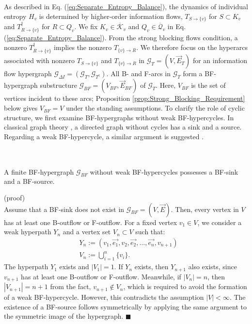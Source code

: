 \documentclass{comnet}%
\begin{document}
As described in Eq. (\ref{eq:Separate_Entropy_Balance}), the dynamics of individual entropy $H_{v}$ is determined by higher-order information flows, $T_{S \to \{v\}}$ for $S \subset K_v$ and $T^{\dagger}_{R \to \{v\}}$ for $R \subset Q_v$. We fix $K_v\in\overline{\mathcal K}_v$ and $Q_v\in\overline{\mathcal Q}_v$ in Eq. (\ref{eq:Separate_Entropy_Balance}). From the strong blocking flows condition, a nonzero $T^{\dagger}_{R \to \{v\}}$ implies the nonzero $T_{\{v\} \to R}$. We therefore focus on the hyperarcs associated with nonzero $T_{S \to \{v\}}$ and $T_{\{v\} \to R}$ in $\mathcal{G}_{T}=(V, \overrightarrow{E}_{T})$ for an information flow hypergraph $\mathcal{G}_{\Delta I} = (\mathcal{G}_{T}, \mathcal{G}_{T^{\dagger}})$. All B- and F-arcs in $\mathcal G_T$ form a BF-hypergraph substructure $\mathcal{G}_{BF} = (V_{BF}, \overrightarrow{E}_{BF})$ of $\mathcal{G}_{T}$. Here, $V_{BF}$ is the set of vertices incident to these arcs; Proposition \ref{prop:Strong_Blocking_Requirement} below gives $V_{BF}=V$ under the standing assumptions. To clarify the role of cyclic structure, we first examine BF-hypergraphs without weak BF-hypercycles. In classical graph theory \cite{Diestel2017,Kleinberg2005}, a directed graph without cycles has a sink and a source. Regarding a weak BF-hypercycle, a similar argument is suggested \cite{Bretto2013}.\\ \quad \\ \quad \\

\begin{proposition}
	A finite BF-hypergraph $\mathcal{G}_{BF}$ without weak BF-hypercycles possesses a BF-sink and a BF-source.\\
	\label{prop:Exist_BF_sink_source}\end{proposition}
(proof)\\
Assume that a BF-sink does not exist in $\mathcal{G}_{BF} = (V, \overrightarrow{E})$. Then, every vertex in $V$ has at least one B-outflow or F-outflow. For a fixed vertex $v_{1} \in V$, we consider a weak hyperpath $Y_{n}$ and a vertex set $V_{n} \subset V$ such that:
\begin{equation}\begin{aligned}
		&Y_{n} := (v_{1}, \overrightarrow{e_{1}}, v_{2}, \overrightarrow{e_{2}}, \dots, \overrightarrow{e_{n}}, v_{n+1})\\
		&V_{n} := \bigcup_{i=1}^{n} \{ v_{i} \}.
\end{aligned}\end{equation}
The hyperpath $Y_{1}$ exists and $|V_{1}| = 1$. If $Y_{n}$ exists, then $Y_{n+1}$ also exists, since $v_{n+1}$ has at least one B-outflow or F-outflow. Meanwhile, if $|V_{n}| = n$, then $|V_{n+1}| = n+1$ from the fact, $v_{n+1} \not\in V_{n}$, which is required to avoid the formation of a weak BF-hypercycle. However, this contradicts the assumption $|V| < \infty$. The existence of a BF-source follows symmetrically by applying the same argument to the symmetric image of the hypergraph. $\blacksquare$ \\ \quad \\
\end{document}
